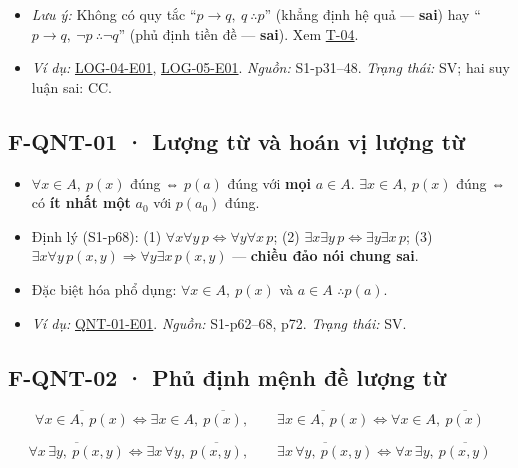 \documentclass[
  10pt,
  twoside,openany]{book}
\providecommand{\tightlist}{%
  \setlength{\itemsep}{0pt}\setlength{\parskip}{0pt}}
\begin{document}
\begin{itemize}
\tightlist
\item
  \emph{Lưu ý:} Không có quy tắc ``\(p\to q,\ q\ \therefore p\)'' (khẳng
  định hệ quả --- \textbf{sai}) hay
  ``\(p\to q,\ \neg p\ \therefore\neg q\)'' (phủ định tiền đề ---
  \textbf{sai}). Xem \protect\hyperlink{T-04}{T-04}.
\item
  \emph{Ví dụ:} \protect\hyperlink{LOG-04-E01}{LOG-04-E01},
  \protect\hyperlink{LOG-05-E01}{LOG-05-E01}. \emph{Nguồn:} S1-p31--48.
  \emph{Trạng thái:} SV; hai suy luận sai: CC.
\end{itemize}

\hypertarget{F-QNT-01}{%
\subsection{F-QNT-01 · Lượng từ và hoán vị lượng từ}\label{F-QNT-01}}

\begin{itemize}
\tightlist
\item
  \(\forall x\in A,\ p(x)\) đúng ⇔ \(p(a)\) đúng với \textbf{mọi}
  \(a\in A\). \(\exists x\in A,\ p(x)\) đúng ⇔ có \textbf{ít nhất một}
  \(a_0\) với \(p(a_0)\) đúng.
\item
  Định lý (S1-p68): (1)
  \(\forall x\forall y\,p\Leftrightarrow\forall y\forall x\,p\); (2)
  \(\exists x\exists y\,p\Leftrightarrow\exists y\exists x\,p\); (3)
  \(\exists x\forall y\,p(x,y)\Rightarrow\forall y\exists x\,p(x,y)\)
  --- \textbf{chiều đảo nói chung sai}.
\item
  Đặc biệt hóa phổ dụng: \(\forall x\in A,\ p(x)\) và \(a\in A\)
  \(\therefore p(a)\).
\item
  \emph{Ví dụ:} \protect\hyperlink{QNT-01-E01}{QNT-01-E01}.
  \emph{Nguồn:} S1-p62--68, p72. \emph{Trạng thái:} SV.
\end{itemize}

\hypertarget{F-QNT-02}{%
\subsection{F-QNT-02 · Phủ định mệnh đề lượng từ}\label{F-QNT-02}}

\[
\overline{\forall x\in A,\ p(x)}\Leftrightarrow\exists x\in A,\ \overline{p(x)},\qquad
\overline{\exists x\in A,\ p(x)}\Leftrightarrow\forall x\in A,\ \overline{p(x)}
\]

\[
\overline{\forall x\,\exists y,\ p(x,y)}\Leftrightarrow\exists x\,\forall y,\ \overline{p(x,y)},\qquad
\overline{\exists x\,\forall y,\ p(x,y)}\Leftrightarrow\forall x\,\exists y,\ \overline{p(x,y)}
\]
\end{document}
